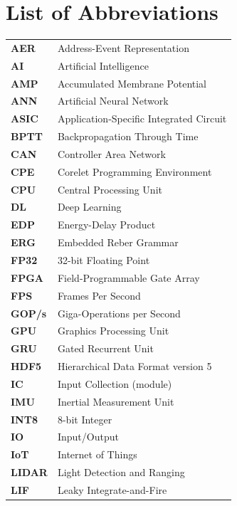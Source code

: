 \documentclass[12pt,a4paper,final]{extreport}
\begin{document}
\chapter*{List of Abbreviations}

\begingroup
{}
\begin{longtable}{p{2.6cm}l}
\textbf{AER} & Address-Event Representation \\
\textbf{AI} & Artificial Intelligence \\
\textbf{AMP} & Accumulated Membrane Potential \\
\textbf{ANN} & Artificial Neural Network \\
\textbf{ASIC} & Application-Specific Integrated Circuit \\
\textbf{BPTT} & Backpropagation Through Time \\
\textbf{CAN} & Controller Area Network \\
\textbf{CPE} & Corelet Programming Environment \\
\textbf{CPU} & Central Processing Unit \\
\textbf{DL} & Deep Learning \\
\textbf{EDP} & Energy-Delay Product \\
\textbf{ERG} & Embedded Reber Grammar \\
\textbf{FP32} & 32-bit Floating Point \\
\textbf{FPGA} & Field-Programmable Gate Array \\
\textbf{FPS} & Frames Per Second \\
\textbf{GOP/s} & Giga-Operations per Second \\
\textbf{GPU} & Graphics Processing Unit \\
\textbf{GRU} & Gated Recurrent Unit \\
\textbf{HDF5} & Hierarchical Data Format version 5 \\
\textbf{IC} & Input Collection (module) \\
\textbf{IMU} & Inertial Measurement Unit \\
\textbf{INT8} & 8-bit Integer \\
\textbf{IO} & Input/Output \\
\textbf{IoT} & Internet of Things \\
\textbf{LIDAR} & Light Detection and Ranging \\
\textbf{LIF} & Leaky Integrate-and-Fire \\

\end{longtable}
\end{document}
